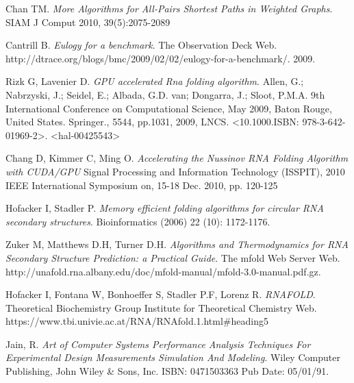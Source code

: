 \documentclass[12pt]{article}
\begin{document}
\begin{thebibliography}{56}
Chan TM.
\textit{More Algorithms for All-Pairs Shortest Paths in Weighted
Graphs}.
SIAM J Comput 2010, 39(5):2075-2089

Cantrill B.
\textit{Eulogy for a benchmark}.
The Observation Deck Web. http://dtrace.org/blogs/bmc/2009/02/02/eulogy-for-a-benchmark/.
2009.

Rizk G, Lavenier D.
\textit{GPU accelerated Rna folding algorithm}.
Allen, G.; Nabrzyski, J.; Seidel, E.; Albada, G.D. van; Dongarra, J.; Sloot, P.M.A. 9th International Conference on Computational Science, May 2009, Baton Rouge, United States. Springer., 5544, pp.1031, 2009, LNCS. <10.1000.ISBN: 978-3-642-01969-2>. <hal-00425543>

Chang D, Kimmer C, Ming O.
\textit{Accelerating the Nussinov RNA Folding Algorithm with CUDA/GPU}
Signal Processing and Information Technology (ISSPIT), 2010 IEEE International Symposium on, 15-18 Dec. 2010, pp. 120-125

Hofacker I, Stadler P.
\textit{Memory efficient folding algorithms for circular RNA secondary structures}.
Bioinformatics (2006) 22 (10): 1172-1176.

Zuker M, Matthews D.H, Turner D.H.
\textit{Algorithms and Thermodynamics for RNA
Secondary Structure Prediction:
a Practical Guide}.
The mfold Web Server Web. http://unafold.rna.albany.edu/doc/mfold-manual/mfold-3.0-manual.pdf.gz.

Hofacker I, Fontana W, Bonhoeffer S, Stadler P.F, Lorenz R.
\textit{RNAFOLD}.
Theoretical Biochemistry Group Institute for Theoretical Chemistry Web. https://www.tbi.univie.ac.at/RNA/RNAfold.1.html\#heading5

Jain, R.
\textit{Art of Computer Systems Performance Analysis Techniques For Experimental Design Measurements Simulation And Modeling}.
Wiley Computer Publishing, John Wiley \& Sons, Inc.
ISBN: 0471503363 Pub Date: 05/01/91.

\end{thebibliography}
\end{document}
